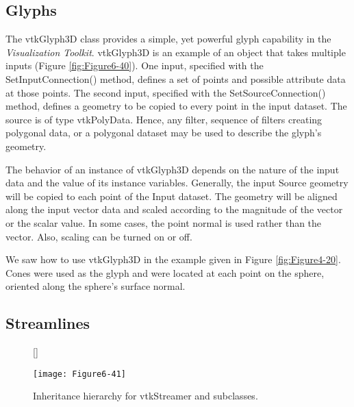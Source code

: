 \subsection{Glyphs}

The vtkGlyph3D class provides a simple, yet powerful glyph capability in the \emph{Visualization Toolkit}. vtkGlyph3D is an example of an object that takes multiple inputs (Figure \ref{fig:Figure6-40}). One input, specified with the SetInputConnection() method, defines a set of points and possible attribute data at those points. The second input, specified with the SetSourceConnection() method, defines a geometry to be copied to every point in the input dataset. The source is of type vtkPolyData. Hence, any filter, sequence of filters creating polygonal data, or a polygonal dataset may be used to describe the glyph's geometry.

The behavior of an instance of vtkGlyph3D depends on the nature of the input data and the value of its instance variables. Generally, the input Source geometry will be copied to each point of the Input dataset. The geometry will be aligned along the input vector data and scaled according to the magnitude of the vector or the scalar value. In some cases, the point normal is used rather than the vector. Also, scaling can be turned on or off.

We saw how to use vtkGlyph3D in the example given in Figure \ref{fig:Figure4-20}. Cones were used as the glyph and were located at each point on the sphere, oriented along the sphere's surface normal.

\subsection{Streamlines}

\begin{figure}[!htb]
	[\FBwidth]
	{\caption{Inheritance hierarchy for vtkStreamer and subclasses.}\label{fig:Figure6-41}}
	{\texttt{[image: Figure6-41]}}
\end{figure}

